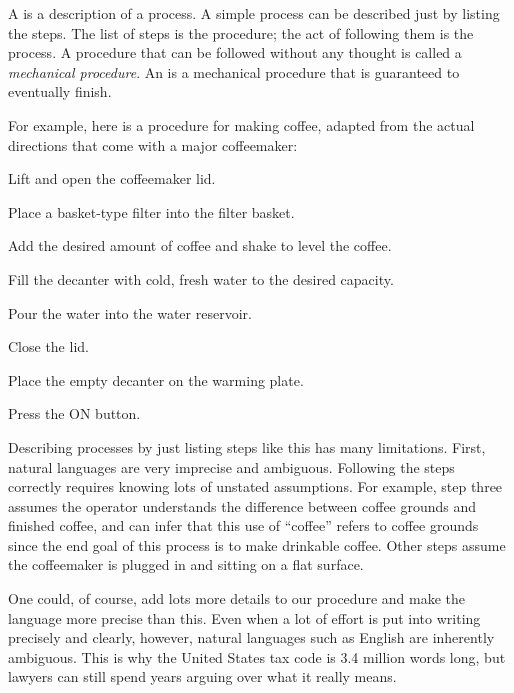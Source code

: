 A  is a description of a process.  A simple process can be described just by listing the steps.  The list of steps is the procedure; the act of following them is the process.  A procedure that can be followed without any thought is called a \emph{mechanical procedure}.  An  is a mechanical procedure that is guaranteed to eventually finish.

For example, here is a procedure for making coffee, adapted from the actual directions that come with a major coffeemaker: 
\begin{enumtight}
\item Lift and open the coffeemaker lid.
\item Place a basket-type filter into the filter basket.
\item Add the desired amount of coffee and shake to level the coffee.
\item Fill the decanter with cold, fresh water to the desired capacity.
\item Pour the water into the water reservoir.
\item Close the lid.
\item Place the empty decanter on the warming plate.
\item Press the ON button.
\end{enumtight}

Describing processes by just listing steps like this has many limitations.  First, natural languages are very imprecise and ambiguous.  Following the steps correctly requires knowing lots of unstated assumptions.  For example, step three assumes the operator understands the difference between coffee grounds and finished coffee, and can infer that this use of ``coffee'' refers to coffee grounds since the end goal of this process is to make drinkable coffee.  Other steps assume the coffeemaker is plugged in and sitting on a flat surface.  

One could, of course, add lots more details to our procedure and make the language more precise than this.  Even when a lot of effort is put into writing precisely and clearly, however, natural languages such as English are inherently ambiguous. This is why the United States tax code is 3.4 million words long, but lawyers can still spend years arguing over what it really means. 


